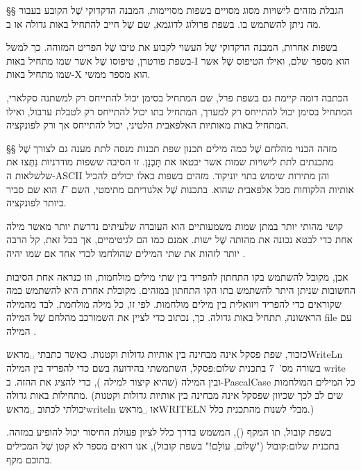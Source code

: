 §§ הגבלת מזהים לישויות מסוג מסויים
בשפות מסויימות, המבנה הדקדוקי שֶׁל ה קובע בעבור מה ניתן להשתמש בו. בשפת
פרולוג לדוגמא, שם שֶׁל  חייב להתחיל באות גדולה או ב.

בשפות אחרות, המבנה הדקדוקי שֶׁל ה עשוי לקבוע את טיבו שֶׁל הפריט המזוהה. כך
למשל בשפת פורטרן, טיפוסו שֶׁל  אשר שמו מתחיל באות-I הוא מספר שלם, ואילו
הטיפוס שֶׁל  אשר שמו מתחיל באות-X הוא מספר ממשי.

הכתבה דומה קיימת גם בשפת פרל, שם  המתחיל בסימן  יכול להתייחס רק
למשתנה סקלארי,  המתחיל בסימן  יכול להתייחס רק למערך,  המתחיל
בתו  יכול להתייחס רק לטבלת ערבול, ואילו  המתחיל באות מאותיות
האלפאבית הלטיני, יכול להתייחס אך ורק לפונקציה.

§§ מזהה הבנוי מהלחם שֶׁל כמה מילים
תכנון שפת תכנות מנסה לתת מענה גם לצורך שֶׁל מתכנתים לתת לישויות שמות אשר יבטאו
את תָּכְנָן. זו הסיבה ששפות מודרניות נִתְּצוּ את שלשלאות ה-ASCII והן מתירות שימוש
בתוי יוניקוד. מזהים בשפות כאלו יכולים להכיל אותיות הלקוחות מכל אלפאבית שהוא.
בתכנות שֶׁל אלגוריתם מתימטי, השם~$Γ$ הוא שם סביר ביותר לפונקציה.

קושי מהותי יותר במתן שמות משמעותיים
הוא העובדה שלעיתים נדרשת יותר מאשר מילה אחת
כדי לבטא נכונה את מהותה שֶׁל ישות. אמנם  כמו 
הם לגיטימיים, אך בכל זאת, קל הרבה יותר לזהות את שתי המילים שהולחמו לכדי 
אחד אם שמו יהיה .

אכן, מקובל להשתמש בקו התחתון להפריד בין שתי מילים מולחמות, וזו כנראה אחת
הסיבות החשובות שניתן היתר להשתמש בתו הקו התחתון במזהים.  מקובלת אחרת
היא להשתמש במה שקוראים  כדי להפריד ויזואלית בין מילים מולחמות.
לפי  זו, כל מילה מולחמת, לבד מהמילה הראשונה, תתחיל באות גדולה. כך,
נכתוב  כדי לציין את ה שמורכב מהלחם שֶׁל המילה {file} עם המילה
.

כזכור, שפת פסקל אינה מבחינה בין אותיות גדולות וקטנות. כאשר כתבתי
␣מראש{WriteLn} בשורה מס'~7 ב תכנית שלום:פסקל, השתמשתי ב הידועה
בשם  כדי להפריד בין המילה {write} ובין המילה  (שהיא
קיצור למילה ), כדי להציג את ה הזה. ב-{PascalCase} כל המילים
המולחמות מתחילות באות גדולה. (שים לב לכך שכיוון שפסקל אינה מבחינה בין אותיות
גדולות וקטנות יכולתי לכתוב ␣מראש{writeln} או ␣מראש{WRITELN} מבלי
לשנות מהתכנית כלל.)

בשפת קובול, תו המקף (), המשמש בדרך כלל לציון פעולת החיסור יכול להופיע
במזהה. ב תכנית שלום:קובול ("שָׁלוֹם, עוֹלָם!" בשפת קובול), אנו רואים מספר לא קטן
שֶׁל  המכילים בתוכם מקף.


